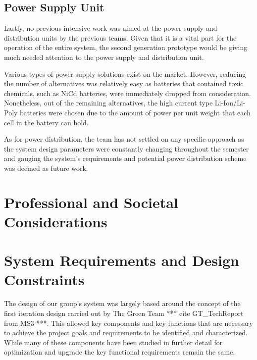\subsection{Power Supply Unit}

\indent\indent Lastly, no previous intensive work was aimed at the power supply and distribution units by the previous teams. Given that it is a vital part for the operation of the entire system, the second generation prototype would be giving much needed attention to the power supply and distribution unit.

\indent Various types of power supply solutions exist on the market. However, reducing the number of alternatives was relatively easy as batteries that contained toxic chemicals, such as NiCd batteries, were immediately dropped from consideration. Nonetheless, out of the remaining alternatives, the high current type Li-Ion/Li-Poly batteries were chosen due to the amount of power per unit weight that each cell in the battery can hold.

\indent As for power distribution, the team has not settled on any specific approach as the system design parameters were constantly changing throughout the semester and gauging the system’s requirements and potential power distribution scheme was deemed as future work.


\section{Professional and Societal Considerations}


\section{System Requirements and Design Constraints}

\indent\indent The design of our group's system was largely based around the concept of the first iteration design carried out by The Green Team *** cite GT\_TechReport from MS3 ***. This allowed key components and key functions that are necessary to achieve the project goals and requirements to be identified and characterized. While many of these components have been studied in further detail for optimization and upgrade the key functional requirements remain the same. 

